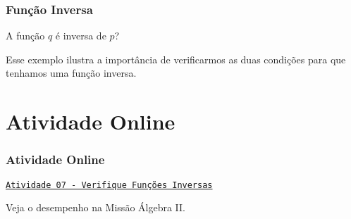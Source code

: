 \documentclass[brazil, notheorems, 10pt]{beamer}
\begin{document}


\begin{frame}
\frametitle{Função Inversa} %

\begin{Exem}
A função $q$ é inversa de $p$?
\end{Exem}\pause
 Esse exemplo ilustra a importância de verificarmos as duas
 condições para que tenhamos uma função inversa.

\end{frame}

\section{Atividade Online}
\begin{frame}
\frametitle{Atividade Online} %

\href{https://pt.khanacademy.org/math/algebra2/manipulating-functions/verifying-that-functions-are-inverses/e/inverses_of_functions}
{{\tt Atividade 07 - Verifique Funções Inversas}}


Veja o desempenho na Missão Álgebra II.


\end{frame}
\end{document}
